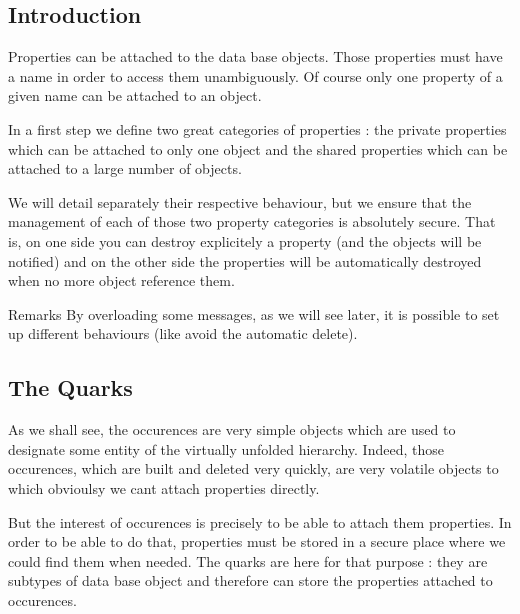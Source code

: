 \hypertarget{classHurricane_1_1Property_secPropertyIntro}{}\subsection{Introduction}\label{classHurricane_1_1Property_secPropertyIntro}
Properties can be attached to the data base objects. Those properties must have a name in order to access them unambiguously. Of course only one property of a given name can be attached to an object.

In a first step we define two great categories of properties \+: the private properties which can be attached to only one object and the shared properties which can be attached to a large number of objects.

We will detail separately their respective behaviour, but we ensure that the management of each of those two property categories is absolutely secure. That is, on one side you can destroy explicitely a property (and the objects will be notified) and on the other side the properties will be automatically destroyed when no more object reference them.

\begin{DoxyRemark}{Remarks}
By overloading some messages, as we will see later, it is possible to set up different behaviours (like avoid the automatic delete).
\end{DoxyRemark}
\hypertarget{classHurricane_1_1Property_secPropertyTheQuarks}{}\subsection{The Quarks}\label{classHurricane_1_1Property_secPropertyTheQuarks}
As we shall see, the occurences are very simple objects which are used to designate some entity of the virtually unfolded hierarchy. Indeed, those occurences, which are built and deleted very quickly, are very volatile objects to which obvioulsy we can\textquotesingle{}t attach properties directly.

But the interest of occurences is precisely to be able to attach them properties. In order to be able to do that, properties must be stored in a secure place where we could find them when needed. The quarks are here for that purpose \+: they are subtypes of data base object and therefore can store the properties attached to occurences.

